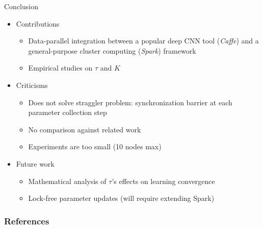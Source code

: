 \documentclass[pdf]{beamer}
\begin{document}
\begin{frame}[t]{Conclusion}
    \begin{itemize}
        \item Contributions
            \begin{itemize}
                \item Data-parallel integration between a popular deep CNN tool
                    (\emph{Caffe}) and a general-purpose cluster computing
                    (\emph{Spark}) framework
                \item Empirical studies on $\tau$ and $K$
            \end{itemize}
        \item Criticisms
            \begin{itemize}
                \item Does not solve straggler problem: synchronization
                    barrier at each parameter collection step
                \item No comparison against related work
                \item Experiments are too small (10 nodes max)
            \end{itemize}

        \item Future work
            \begin{itemize}
                \item Mathematical analysis of $\tau$'s effects
                    on learning convergence
                \item Lock-free parameter updates (will require
                    extending Spark)
            \end{itemize}
    \end{itemize}
\end{frame}

\begin{frame}[allowframebreaks]
    \frametitle{References}
    
    \nocite{*}
    
\end{frame}
\end{document}
